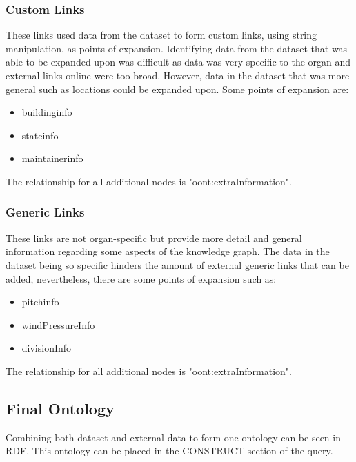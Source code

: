 \subsubsection{Custom Links}
\hspace*{0.5cm} These links used data from the dataset to form custom links, using string manipulation, as points of expansion. Identifying data from the dataset that was able to be expanded upon was difficult as data was very specific to the organ and external links online were too broad. However, data in the dataset that was more general such as locations could be expanded upon. Some points of expansion are:

\begin{itemize}
    \itemsep0em 
    \item buildinginfo
    \item stateinfo
    \item maintainerinfo
\end{itemize}

The relationship for all additional nodes is "oont:extraInformation".

\subsubsection{Generic Links}
\hspace*{0.5cm} These links are not organ-specific but provide more detail and general information regarding some aspects of the knowledge graph. The data in the dataset being so specific hinders the amount of external generic links that can be added, nevertheless, there are some points of expansion such as:

\begin{itemize}
    \itemsep0em 
    \item pitchinfo
    \item windPressureInfo
    \item divisionInfo
\end{itemize}

The relationship for all additional nodes is "oont:extraInformation".

\subsection{Final Ontology}
\hspace*{0.5cm} Combining both dataset and external data to form one ontology can be seen in RDF. This ontology can be placed in the CONSTRUCT section of the query.

